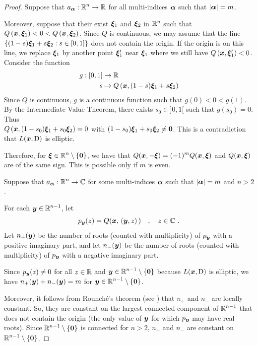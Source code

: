 \begin{proof}
 Suppose that $\displaystyle a_{{\bm{\alpha}}}:\mathbb{R}^n\rightarrow \mathbb{R}$
for all multi-indices ${\bm{\alpha}}$ such that $|{\bm{\alpha}}|=m$.

Moreover, suppose that their exist ${\bm{\xi}}_1$ and ${\bm{\xi}}_2$ in
$\displaystyle \mathbb{R}^n$ such that
$\displaystyle Q\left({\bm{x}}, {\bm{\xi}}_1\right) < 0 <
Q\left({\bm{x}}, {\bm{\xi}}_2\right)$.  Since $Q$ is continuous, we may
assume that the line
$\displaystyle \left\{ (1-s){\bm{\xi}}_1 + s{\bm{\xi}}_2 : s \in [0,1] \right\}$
does not contain the origin.  If the origin is on this line, we
replace ${\bm{\xi}}_1$ by another point ${\bm{\xi}}_1'$ near
${\bm{\xi}}_1$ where we still have
$Q\left({\bm{x}}, {\bm{\xi}}_1'\right) < 0$.  Consider the function
\begin{align*}
g:[0,1] &\rightarrow \mathbb{R} \\
s &\mapsto Q\left({\bm{x}}, (1-s){\bm{\xi}}_1 + s{\bm{\xi}}_2\right)
\end{align*}
Since $Q$ is continuous, $g$ is a continuous function such that
$g(0)<0<g(1)$.  By the Intermediate Value Theorem, there exists
$s_0 \in ]0,1[$ such that $g(s_0)=0$.  Thus\\
$\displaystyle
Q\left({\bm{x}}, (1-s_0){\bm{\xi}}_1 + s_0{\bm{\xi}}_2\right) = 0$
with $\displaystyle (1-s_0){\bm{\xi}}_1 + s_0{\bm{\xi}}_2 \neq {\bm{0}}$.
This is a contradiction that $L({\bm{x}}, \operatorname{D})$ is elliptic.

Therefore, for
$\displaystyle {\bm{\xi}} \in \mathbb{R}^n \setminus \{{\bm{0}}\}$, we have
that $\displaystyle Q({\bm{x}}, -{\bm{\xi}}) = (-1)^mQ({\bm{x}}, {\bm{\xi}})$
and $\displaystyle Q({\bm{x}}, {\bm{\xi}})$ are of the same sign.  This
is possible only if $m$ is even.

 Suppose that
$\displaystyle a_{{\bm{\alpha}}}:\mathbb{R}^n\rightarrow \mathbb{C}$ for some
multi-indices ${\bm{\alpha}}$ such that $|{\bm{\alpha}}|=m$ and $n>2$.

For each $\displaystyle {\bm{y}} \in \mathbb{R}^{n-1}$, let
\[
p_{{\bm{y}}}(z) = Q({\bm{x}}, \,({\bm{y}},z)\,) \quad , \quad z \in \mathbb{C} \ .
\]
Let $n_+({\bm{y}})$ be the number of roots (counted with multiplicity)
of $p_{{\bm{y}}}$ with a positive imaginary part, and let $n_-({\bm{y}})$ be
the number of roots (counted with multiplicity) of $p_{{\bm{y}}}$ with
a negative imaginary part.

Since $p_{{\bm{y}}}(z) \neq 0$ for all $z\in \mathbb{R}$ and
$\displaystyle {\bm{y}} \in \mathbb{R}^{n-1}\setminus \{{\bm{0}}\}$ because
$L({\bm{x}},\operatorname{D})$ is elliptic, we have $n_+({\bm{y}})+n_-({\bm{y}})=m$
for $\displaystyle {\bm{y}} \in \mathbb{R}^{n-1}\setminus \{{\bm{0}}\}$.

Moreover, it follows from Rounch\'e's theorem (see \cite{Co}) that
$n_+$ and $n_-$ are locally constant.  So, they are constant on the
largest connected component of $\displaystyle \mathbb{R}^{n-1}$ that does not
contain the origin (the only value of ${\bm{y}}$ for which
$p_{{\bm{y}}}$ may have real roots).  Since
$\displaystyle \mathbb{R}^{n-1}\setminus\{{\bm{0}}\}$ is connected for
$n>2$,  $n_+$ and $n_-$ are constant on
$\displaystyle \mathbb{R}^{n-1}\setminus\{{\bm{0}}\}$.


\end{proof}
